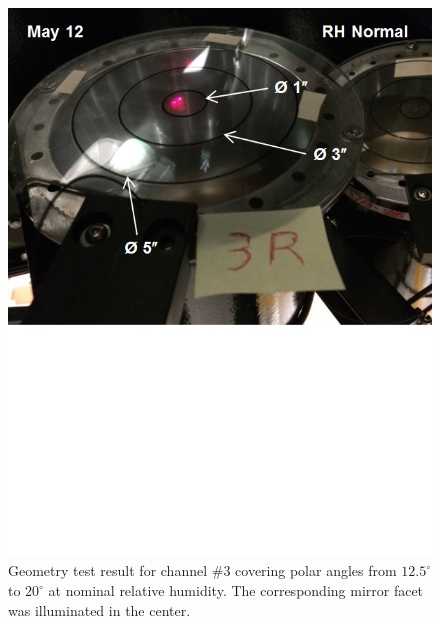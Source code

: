 \begin{figure}[ht]
    \centering
    \includegraphics[width=1.0\linewidth,trim={0 8.5cm 0 0},clip]{images/GEO_TEST_3_Normal.jpg}
    \caption{Geometry test result for channel \#3 covering polar angles from $12.5^\circ$ to $20^\circ$ at
      nominal relative humidity. The corresponding mirror facet was illuminated in the center.}
    \label{fig:GEO_TEST_3_Normal}
\end{figure}

